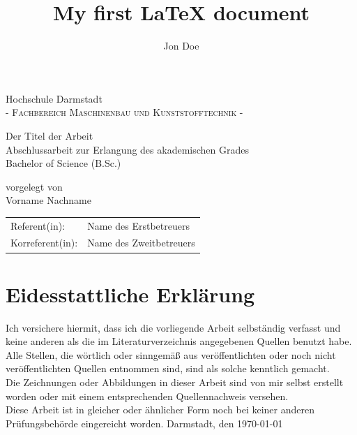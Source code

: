\documentclass[a4paper,12pt]{article}
\title{My first \LaTeX{} document}
\author{Jon Doe}
\begin{document}
\newpage\null\thispagestyle{empty}\newpage
\newpage
\pagestyle{empty}


\begin{center}
\Large Hochschule Darmstadt \\
\normalsize \textsc{- Fachbereich Maschinenbau und Kunststofftechnik -} \\

\vfill

\Huge Der Titel der Arbeit \\
\normalsize
\vspace{12pt}
Abschlussarbeit zur Erlangung des akademischen Grades \\ 
Bachelor of Science (B.Sc.)

\vfill

vorgelegt von \\
Vorname Nachname

\vfill

\begin{tabular}[h]{p{4cm}l}
	Referent(in): & Name des Erstbetreuers\\
	Korreferent(in):  & Name des Zweitbetreuers \\
\end{tabular}

\end{center}

\newpage
\pagestyle{plain}
\section*{Eidesstattliche Erklärung}
Ich versichere hiermit, dass ich die vorliegende Arbeit selbständig verfasst und keine
anderen als die im Literaturverzeichnis angegebenen Quellen benutzt habe. \\

\noindent Alle Stellen, die wörtlich oder sinngemäß aus veröffentlichten oder noch nicht veröffentlichten
Quellen entnommen sind, sind als solche kenntlich gemacht. \\

\noindent Die Zeichnungen oder Abbildungen in dieser Arbeit sind von mir selbst erstellt worden oder mit
einem entsprechenden Quellennachweis versehen. \\

\noindent Diese Arbeit ist in gleicher oder ähnlicher Form noch bei keiner anderen Prüfungsbehörde
eingereicht worden.
\newline\newline
Darmstadt, den \today
\newpage
\end{document}
